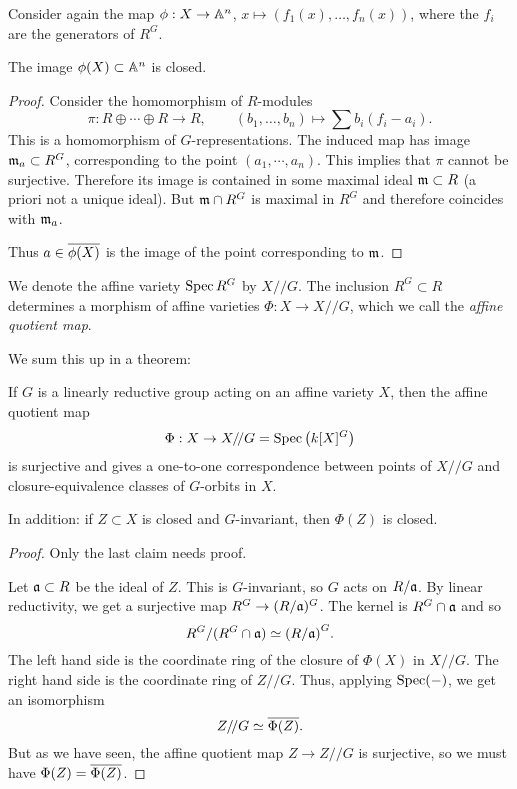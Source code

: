 \documentclass[11pt, english]{article}
\begin{document}
Consider again the map $\phi:X \to \mathbb{A}^n$, $x \mapsto (f_1(x),\ldots,f_n(x))$, where the $f_i$ are the generators of $R^G$.

\begin{prop}
The image $\phi(X) \subset \mathbb{A}^n$ is closed.
\end{prop}
\begin{proof}
 Consider the homomorphism of $R$-modules
\[
\pi: R \oplus \cdots \oplus R \to R, \qquad (b_1,\ldots,b_n) \mapsto \sum b_i(f_i-a_i).
\]
This is a homomorphism of $G$-representations. The induced map has image $\mathfrak{m}_a \subset R^G$, corresponding to the point $(a_1,\cdots, a_n)$. This implies that $\pi$ cannot be surjective. Therefore its image is contained in some maximal ideal $\mathfrak{m} \subset R$ (a priori not a unique ideal). But $\mathfrak{m}\cap R^G$ is maximal in $R^G$ and therefore coincides with $\mathfrak{m}_a$.

Thus $a \in \overline{\phi(X)}$ is the image of the point corresponding to $\mathfrak{m}$.
\end{proof}

\begin{defi}
 We denote the affine variety $\operatorname{Spec} R^G$ by $X/\!/G$. The inclusion $R^G \subset R$ determines a morphism of affine varieties $\Phi:X \to X /\!/ G$, which we call the \emph{affine quotient map}.
\end{defi}

We sum this up in a theorem:

\begin{thm}
 If $G$ is a linearly reductive group acting on an affine variety $X$, then the affine quotient map
$$
\Phi: X \to X /\!/ G = \operatorname{Spec} \left(k[X]^G\right)
$$
is surjective and gives a one-to-one correspondence between points of $X /\! / G$ and closure-equivalence classes of $G$-orbits in $X$.

In addition: if $Z \subset X$ is closed and $G$-invariant, then $\Phi(Z)$ is closed.
\end{thm}
\begin{proof}
Only the last claim needs proof.

Let $\mathfrak{a} \subset R$ be the ideal of $Z$. This is $G$-invariant, so $G$ acts on $R/\mathfrak{a}$. By linear reductivity, we get a surjective map $R^G \to (R/\mathfrak{a})^G$. The kernel is $R^G \cap \mathfrak{a}$ and so
\[
R^G/(R^G \cap \mathfrak{a}) \simeq {(R/\mathfrak{a})}^G.
\]
The left hand side is the coordinate ring of the closure of $\Phi(X)$ in $X /\!/ G$. The right hand side is the coordinate ring of $Z /\!/ G$. Thus, applying $\operatorname{Spec}(-)$, we get an isomorphism
$$
Z /\!/ G \simeq \overline{\Phi{(Z)}}.
$$
But as we have seen, the affine quotient map $Z \to Z/\!/ G$ is surjective, so we must have $\Phi(Z) = \overline{\Phi(Z)}$.
\end{proof}
\end{document}
